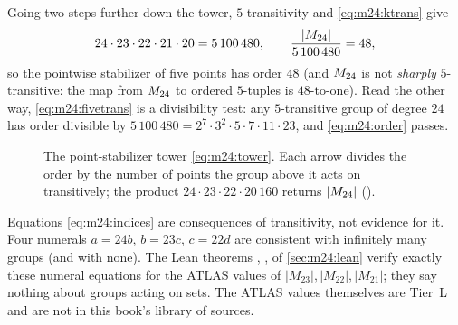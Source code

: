 Going two steps further down the tower, $5$-transitivity and \eqref{eq:m24:ktrans} give
\begin{equation}\label{eq:m24:fivetrans}
 24\cdot23\cdot22\cdot21\cdot20=5\,100\,480,\qquad
 \frac{|M_{24}|}{5\,100\,480}=48 ,
\end{equation}
so the pointwise stabilizer of five points has order $48$ (and $M_{24}$ is not \emph{sharply}
$5$-transitive: the map from $M_{24}$ to ordered $5$-tuples is $48$-to-one). Read the other
way, \eqref{eq:m24:fivetrans} is a divisibility test: any $5$-transitive group of degree $24$
has order divisible by $5\,100\,480=2^7\cdot3^2\cdot5\cdot7\cdot11\cdot23$, and
\eqref{eq:m24:order} passes.

\begin{figure}[t]\centering
{}
\caption{The point-stabilizer tower \eqref{eq:m24:tower}. Each arrow divides the order by the
number of points the group above it acts on transitively; the product
$24\cdot23\cdot22\cdot20\,160$ returns $|M_{24}|$ ().}
\label{fig:m24:tower}
\end{figure}

\begin{pitfallbox}
Equations \eqref{eq:m24:indices} are consequences of transitivity, not evidence for it.
Four numerals $a=24b$, $b=23c$, $c=22d$ are consistent with infinitely many groups (and with
none). The Lean theorems , ,
 of \cref{sec:m24:lean} verify exactly these numeral equations
for the ATLAS values of $|M_{23}|,|M_{22}|,|M_{21}|$; they say nothing about groups acting on
sets. The ATLAS values themselves are Tier~L and are not in this book's library of sources.
\end{pitfallbox}

